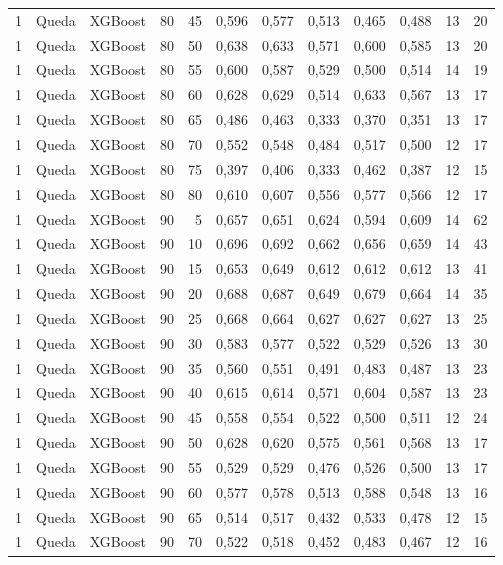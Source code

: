 \begin{longtable}{@{}rllrrrrrrrrr@{}}
1 & Queda & XGBoost & 80 & 45 & 0,596 & 0,577 & 0,513 & 0,465 & 0,488 & 13 & 20 \\
1 & Queda & XGBoost & 80 & 50 & 0,638 & 0,633 & 0,571 & 0,600 & 0,585 & 13 & 20 \\
1 & Queda & XGBoost & 80 & 55 & 0,600 & 0,587 & 0,529 & 0,500 & 0,514 & 14 & 19 \\
1 & Queda & XGBoost & 80 & 60 & 0,628 & 0,629 & 0,514 & 0,633 & 0,567 & 13 & 17 \\
1 & Queda & XGBoost & 80 & 65 & 0,486 & 0,463 & 0,333 & 0,370 & 0,351 & 13 & 17 \\
1 & Queda & XGBoost & 80 & 70 & 0,552 & 0,548 & 0,484 & 0,517 & 0,500 & 12 & 17 \\
1 & Queda & XGBoost & 80 & 75 & 0,397 & 0,406 & 0,333 & 0,462 & 0,387 & 12 & 15 \\
1 & Queda & XGBoost & 80 & 80 & 0,610 & 0,607 & 0,556 & 0,577 & 0,566 & 12 & 17 \\
1 & Queda & XGBoost & 90 & 5 & 0,657 & 0,651 & 0,624 & 0,594 & 0,609 & 14 & 62 \\
1 & Queda & XGBoost & 90 & 10 & 0,696 & 0,692 & 0,662 & 0,656 & 0,659 & 14 & 43 \\
1 & Queda & XGBoost & 90 & 15 & 0,653 & 0,649 & 0,612 & 0,612 & 0,612 & 13 & 41 \\
1 & Queda & XGBoost & 90 & 20 & 0,688 & 0,687 & 0,649 & 0,679 & 0,664 & 14 & 35 \\
1 & Queda & XGBoost & 90 & 25 & 0,668 & 0,664 & 0,627 & 0,627 & 0,627 & 13 & 25 \\
1 & Queda & XGBoost & 90 & 30 & 0,583 & 0,577 & 0,522 & 0,529 & 0,526 & 13 & 30 \\
1 & Queda & XGBoost & 90 & 35 & 0,560 & 0,551 & 0,491 & 0,483 & 0,487 & 13 & 23 \\
1 & Queda & XGBoost & 90 & 40 & 0,615 & 0,614 & 0,571 & 0,604 & 0,587 & 13 & 23 \\
1 & Queda & XGBoost & 90 & 45 & 0,558 & 0,554 & 0,522 & 0,500 & 0,511 & 12 & 24 \\
1 & Queda & XGBoost & 90 & 50 & 0,628 & 0,620 & 0,575 & 0,561 & 0,568 & 13 & 17 \\
1 & Queda & XGBoost & 90 & 55 & 0,529 & 0,529 & 0,476 & 0,526 & 0,500 & 13 & 17 \\
1 & Queda & XGBoost & 90 & 60 & 0,577 & 0,578 & 0,513 & 0,588 & 0,548 & 13 & 16 \\
1 & Queda & XGBoost & 90 & 65 & 0,514 & 0,517 & 0,432 & 0,533 & 0,478 & 12 & 15 \\
1 & Queda & XGBoost & 90 & 70 & 0,522 & 0,518 & 0,452 & 0,483 & 0,467 & 12 & 16 \\

\end{longtable}
